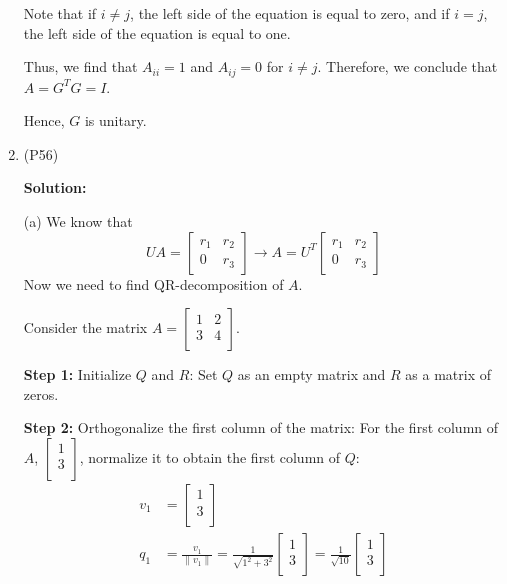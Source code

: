 \documentclass{article}
\begin{document}
\begin{enumerate}[leftmargin=\labelsep]
Note that if \(i \neq j\), the left side of the equation is equal to zero, and if \(i = j\), the left side of the equation is equal to one.

Thus, we find that \(A_{ii} = 1\) and \(A_{ij} = 0\) for \(i \neq j\). Therefore, we conclude that \(A = G^T G = I\).

Hence, \(G\) is unitary.
\item (P56)

\textbf{Solution: }

(a) We know that 
$$UA = \begin{bmatrix}
	r_1 & r_2 \\
	0 & r_3
\end{bmatrix} \rightarrow A = U^T \begin{bmatrix}
	r_1 & r_2 \\
	0 & r_3
\end{bmatrix}$$
Now we need to find QR-decomposition of $A$.

Consider the matrix $A = \begin{bmatrix}
1 & 2 \\
3 & 4 \\
\end{bmatrix}$.

\textbf{Step 1:} Initialize $Q$ and $R$:
Set $Q$ as an empty matrix and $R$ as a matrix of zeros.

\textbf{Step 2:} Orthogonalize the first column of the matrix:
For the first column of $A$, $\begin{bmatrix}
1 \\
3 \\
\end{bmatrix}$, normalize it to obtain the first column of $Q$:
\begin{align*}
v_1 &= \begin{bmatrix}
1 \\
3 \\
\end{bmatrix} \\
q_1 &= \frac{v_1}{\|v_1\|} = \frac{1}{\sqrt{1^2 + 3^2}} \begin{bmatrix}
1 \\
3 \\
\end{bmatrix} = \frac{1}{\sqrt{10}} \begin{bmatrix}
1 \\
3 \\
\end{bmatrix}
\end{align*}


\end{enumerate}
\end{document}
